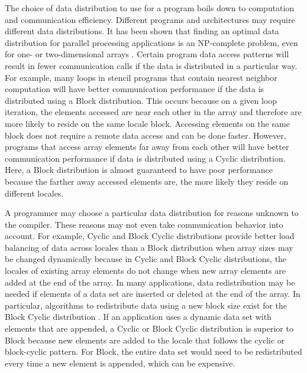 The choice of data distribution to use for a program boils down to computation and communication efficiency. Different programs and architectures may require different data distributions. It has been shown that finding an optimal data distribution for parallel processing applications is an NP-complete problem, even for one- or two-dimensional arrays \cite{mace1987memory}. Certain program data access patterns will result in fewer communication calls if the data is distributed in a particular way. For example, many loops in stencil programs that contain nearest neighbor computation will have better communication performance if the data is distributed using a Block distribution. This occurs because on a given loop iteration, the elements accessed are near each other in the array and therefore are more likely to reside on the same locale block. Accessing elements on the same block does not require a remote data access and can be done faster. However, programs that access array elements far away from each other will have better communication performance if data is distributed using a Cyclic distribution. Here, a Block distribution is almost guaranteed to have poor performance because the farther away accessed elements are, the more likely they reside on different locales. 

A programmer may choose a particular data distribution for reasons unknown to the compiler. These reasons may not even take communication behavior into account. For example, Cyclic and Block Cyclic distributions provide better load balancing of data across locales than a Block distribution when array sizes may be changed dynamically because in Cyclic and Block Cyclic distributions, the locales of existing array elements do not change when new array elements are added at the end of the array. In many applications, data redistribution may be needed if elements of a data set are inserted or deleted at the end of the array. In particular, algorithms to redistribute data using a new block size exist for the Block Cyclic distribution \cite{prylli1997fast,walker1996redistribution}. If an application uses a dynamic data set with elements that are appended, a Cyclic or Block Cyclic distribution is superior to Block because new elements are added to the locale that follows the cyclic or block-cyclic pattern. For Block, the entire data set would need to be redistributed every time a new element is appended, which can be expensive. 

